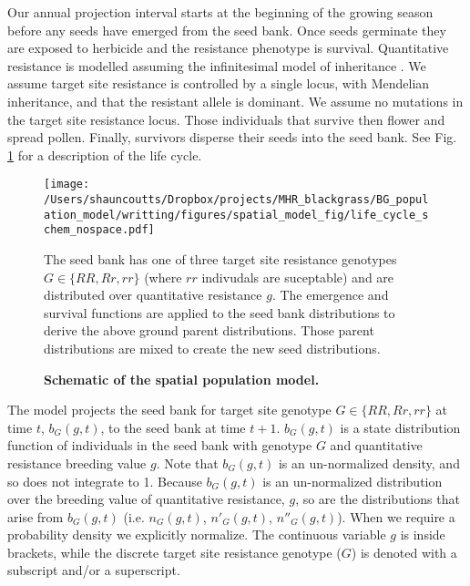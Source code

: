 \documentclass[10pt,letterpaper]{article}
\begin{document}
Our annual projection interval starts at the beginning of the growing season before any seeds have emerged from the seed bank. Once seeds germinate they are exposed to herbicide and the resistance phenotype is survival.  Quantitative resistance is modelled assuming the infinitesimal model of inheritance \cite{Fish1918}. We assume target site resistance is controlled by a single locus, with Mendelian inheritance, and that the resistant allele is dominant. We assume no mutations in the target site resistance locus. Those individuals that survive then flower and spread pollen. Finally, survivors disperse their seeds into the seed bank. See Fig. \ref{fig:schematic} for a description of the life cycle.  

\begin{figure}[!h]
	\centering
	\texttt{[image: /Users/shauncoutts/Dropbox/projects/MHR\_blackgrass/BG\_population\_model/writting/figures/spatial\_model\_fig/life\_cycle\_schem\_nospace.pdf]}
\caption{\bf Schematic of the spatial population model.} The seed bank has one of three target site resistance genotypes $G \in \{RR, Rr, rr\}$ (where $rr$ indivudals are suceptable) and are distributed over quantitative resistance $g$. The emergence and survival functions are applied to the seed bank distributions to derive the above ground parent distributions. Those parent distributions are mixed to create the new seed distributions. \label{fig:schematic}
\end{figure}

The model projects the seed bank for target site genotype $G \in \{RR, Rr, rr\}$ at time $t$, $b_G(g, t)$, to the seed bank at time $t+1$. $b_G(g, t)$ is a state distribution function of individuals in the seed bank with genotype $G$ and quantitative resistance breeding value $g$. Note that $b_G(g, t)$ is an un-normalized density, and so does not integrate to 1. Because $b_G(g, t)$ is an un-normalized distribution over the breeding value of quantitative resistance, $g$, so are the distributions that arise from $b_G(g, t)$ (i.e. $n_G(g, t)$, $n'_G(g, t)$, $n''_G(g, t)$). When we require a probability density we explicitly normalize. The continuous variable $g$ is inside brackets, while the discrete target site resistance genotype ($G$) is denoted with a subscript and/or a superscript.    
\end{document}
